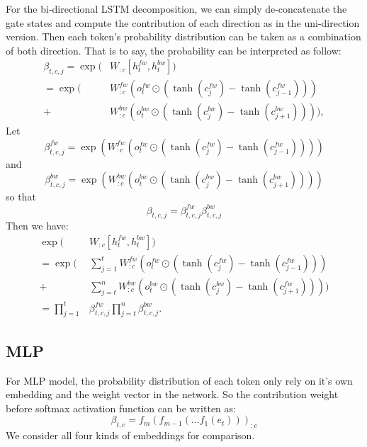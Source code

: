 \documentclass{article}
\begin{document}
For the bi-directional LSTM decomposition, we can simply de-concatenate the gate states and compute the contribution of each direction as in the uni-direction version. Then each token's probability distribution can be taken as a combination of both direction. That is to say, the probability can be interpreted as follow:
\begin{align}\label{eq:bi-beta} 
\beta_{t, c, j} = \exp(&W_{:c} [h_t^{fw}, h_t^{bw}])\\
= \exp(&W_{:c}^{fw} (o_t^{fw} \odot (\tanh(c_j^{fw})- \tanh(c_{j-1}^{fw}))) \\
+ &W_{:c}^{bw} (o_t^{bw} \odot (\tanh(c_j^{bw})- \tanh(c_{j+1}^{bw})))),
\end{align}
Let
\begin{equation}
\beta_{t, c, j}^{fw} = \exp(W_{:c}^{fw} (o_t^{fw} \odot (\tanh(c_j^{fw})- \tanh(c_{j-1}^{fw}))))
\end{equation}
and
\begin{equation}
\beta_{t, c, j}^{bw} = \exp(W_{:c}^{bw} (o_t^{bw} \odot (\tanh(c_j^{bw})- \tanh(c_{j+1}^{bw}))))
\end{equation}
so that 
\begin{equation}
\beta_{t, c, j} = \beta_{t, c, j}^{fw} \beta_{t, c, j}^{bw}
\end{equation}
Then we have:
\begin{align}
	\exp(&W_{:c} [h_t^{fw}, h_t^{bw}]) \\
= \exp(&\sum_{j=1}^t W_{:c}^{fw} (o_t^{fw} \odot (\tanh(c_j^{fw}) - \tanh(c_{j-1}^{fw})))\\
	+&\sum_{j=t}^n W_{:c}^{bw} (o_t^{bw} \odot (\tanh(c_j^{bw}) - \tanh(c_{j+1}^{fw}))))\\
= \prod_{j=1}^t &\beta_{t, c, j}^{fw} \prod_{j=t}^n \beta_{t, c, j}^{bw}.
\end{align}

\subsection{MLP}

For MLP model, the probability distribution of each token only rely on it's own embedding and the weight vector in the network. So the contribution weight before softmax activation function can be written as: 
\begin{equation}
\beta_{t, c} = f_m(f_{m-1}(...f_1(e_t)))_{:c}
\end{equation} 
We consider all four kinds of embeddings for comparison.
\end{document}

